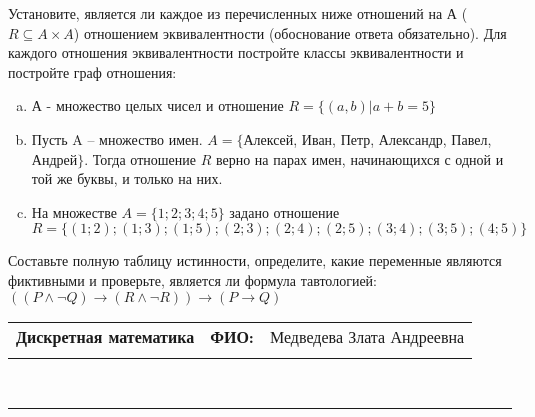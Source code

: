 \documentclass[10pt]{exam}
\newcommand{\class}{Дискретная математика}
\newcommand{\examdate}{}
\begin{document}
\begin{questions}
\question
Установите, является ли каждое из перечисленных ниже отношений на А ($R \subseteq A \times A$) отношением эквивалентности (обоснование ответа обязательно). Для каждого отношения эквивалентности постройте классы 
эквивалентности и постройте граф отношения:
\begin{enumerate} [a)]\setcounter{enumi}{0}
\item А - множество целых чисел и отношение $R = \{(a,b)|a + b = 5\}$
\item Пусть A – множество имен. $A = \{ $Алексей, Иван, Петр, Александр, Павел, Андрей$ \}$. Тогда отношение $R $ верно на парах имен, начинающихся с одной и той же буквы, и только на них.
\item На множестве $A = \{1; 2; 3; 4; 5\}$ задано отношение $R = \{(1; 2); (1; 3); (1; 5); (2; 3); (2; 4); (2; 5); (3; 4); (3; 5); (4; 5)\}$
\end{enumerate}\question Составьте полную таблицу истинности, определите, какие переменные являются фиктивными и проверьте, является ли формула тавтологией:
$(( P \land \neg Q) \rightarrow (R \land \neg R)) \rightarrow (P \rightarrow Q)$

\end{questions}
\newpage
\begin{flushright}
\begin{tabular}{p{2.8in} r l}
\textbf{\class} & \textbf{ФИО:} &Медведева Злата Андреевна
\\

\textbf{\examdate} &&\\
\end{tabular}\\
\end{flushright}
\rule[1ex]{\textwidth}{.1pt}
\end{document}
